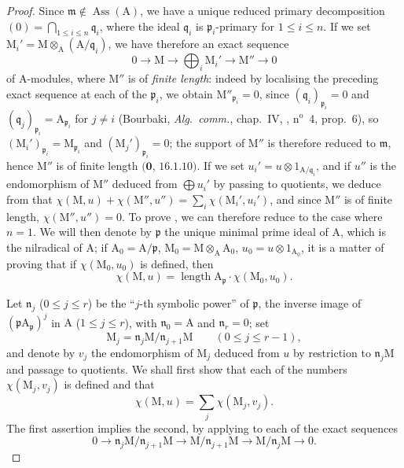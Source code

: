 \begin{proof}
Since $\mathfrak{m}\notin\operatorname{Ass}(\mathrm{A})$, we have a unique reduced primary decomposition $(0)=\bigcap_{1\leq i\leq n}\mathfrak{q}_i$, where the ideal $\mathfrak{q}_i$ is $\mathfrak{p}_i$-primary for $1\leq i\leq n$.
If we set $\mathrm{M}_i'=\mathrm{M}\otimes_{\mathrm{A}}(\mathrm{A}/\mathfrak{q}_i)$, we have therefore an exact sequence
\[
  0\to\mathrm{M}\to\bigoplus_i\mathrm{M}_i'\to\mathrm{M}''\to 0
\]
of A-modules, where $\mathrm{M}''$ is of \emph{finite length}: indeed by localising the preceding exact sequence at each of the $\mathfrak{p}_i$, we obtain $\mathrm{M}''_{\mathfrak{p}_i}=0$, since $(\mathfrak{q}_i)_{\mathfrak{p}_i}=0$ and $(\mathfrak{q}_j)_{\mathfrak{p}_i}=\mathrm{A}_{\mathfrak{p}_i}$ for $j\neq i$ (Bourbaki, \emph{Alg.\ comm.}, chap.~IV, , n$^{\mathrm{o}}$~4, prop.~6), so $(\mathrm{M}_i')_{\mathfrak{p}_i}=\mathrm{M}_{\mathfrak{p}_i}$ and $(\mathrm{M}_j')_{\mathfrak{p}_i}=0$;
the support of $\mathrm{M}''$ is therefore reduced to $\mathfrak{m}$, hence $\mathrm{M}''$ is of finite length $(\mathbf{0}$, $16.1.10)$.
If we set $u_i'=u\otimes 1_{\mathrm{A}/\mathfrak{q}_i}$, and if $u''$ is the endomorphism of $\mathrm{M}''$ deduced from $\bigoplus u_i'$ by passing to quotients, we deduce from  that $\chi(\mathrm{M},u)+\chi(\mathrm{M}'',u'')=\sum_i\chi(\mathrm{M}_i',u_i')$, and since $\mathrm{M}''$ is of finite length, $\chi(\mathrm{M}'',u'')=0$.
To prove , we can therefore reduce to the case where $n=1$.
We will then denote by $\mathfrak{p}$ the unique minimal prime ideal of $\mathrm{A}$, which is the nilradical of $\mathrm{A}$; if $\mathrm{A}_0=\mathrm{A}/\mathfrak{p}$, $\mathrm{M}_0=\mathrm{M}\otimes_{\mathrm{A}}\mathrm{A}_0$, $u_0=u\otimes 1_{\mathrm{A}_0}$, it is a matter of proving that if $\chi(\mathrm{M}_0,u_0)$ is defined, then
\[
\label{IV.21.10.17.9}
  \chi(\mathrm{M},u)=\operatorname{length}\mathrm{A}_{\mathfrak{p}}\cdot\chi(\mathrm{M}_0,u_0).
  \tag{21.10.17.9}
\]

Let $\mathfrak{n}_j$ ($0\leq j\leq r$) be the ``$j$-th symbolic power'' of $\mathfrak{p}$, the inverse image of $(\mathfrak{p}\mathrm{A}_{\mathfrak{p}})^j$ in $\mathrm{A}$ ($1\leq j\leq r$), with $\mathfrak{n}_0=\mathrm{A}$ and $\mathfrak{n}_r=0$; set
\[
  \mathrm{M}_j=\mathfrak{n}_j\mathrm{M}/\mathfrak{n}_{j+1}\mathrm{M}\qquad(0\leq j\leq r-1),
\]
and denote by $v_j$ the endomorphism of $\mathrm{M}_j$ deduced from $u$ by restriction to $\mathfrak{n}_j\mathrm{M}$ and passage to quotients.
We shall first show that each of the numbers $\chi(\mathrm{M}_j,v_j)$ is defined and that
\[
\label{IV.21.10.17.10}
  \chi(\mathrm{M},u)=\sum_j\chi(\mathrm{M}_j,v_j).
  \tag{21.10.17.10}
\]
The first assertion implies the second, by applying  to each of the exact sequences
\[
  0\to\mathfrak{n}_j\mathrm{M}/\mathfrak{n}_{j+1}\mathrm{M}\to\mathrm{M}/\mathfrak{n}_{j+1}\mathrm{M}\to\mathrm{M}/\mathfrak{n}_j\mathrm{M}\to 0.
\]


\end{proof}
